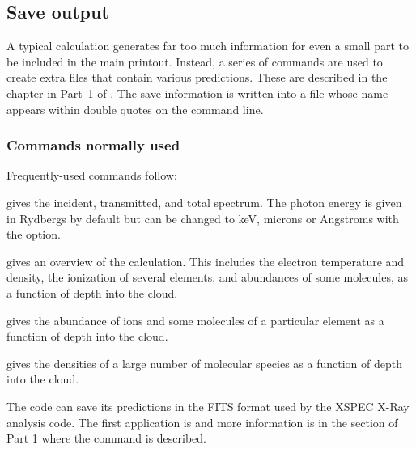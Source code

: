 \documentclass[12pt,twoside]{article}
\begin{document}
{







\subsection{Save output}
\label{sec:SaveOutput}

A typical calculation generates far too much information for even a small
part to be included in the main printout.  Instead, a series of
commands are used to create extra files that contain various predictions.
These are described in the chapter 
in Part~1 of \Hazy.
The save information is written into a file whose name appears
within double quotes on the command line.

\subsubsection{Commands normally used}

Frequently-used commands follow:

 gives the incident,
transmitted, and total spectrum.
The photon energy is given in Rydbergs by default but can be changed to
keV, microns or Angstroms with the  option.

 gives an overview
of the calculation.  This includes the
electron temperature and density, the ionization of several elements, and
abundances of some molecules, as a function of depth into the cloud.

 gives the abundance
of ions and some molecules of a
particular element as a function of depth into the cloud.

 gives the densities
of a large number of molecular species
as a function of depth into the cloud.

\quad The code can save
its predictions in the FITS format used
by the XSPEC X-Ray analysis code.  The first application is \citet{PorterEtAl06}
and more information is in the section
of Part 1 where the  command is described.

}
\end{document}
